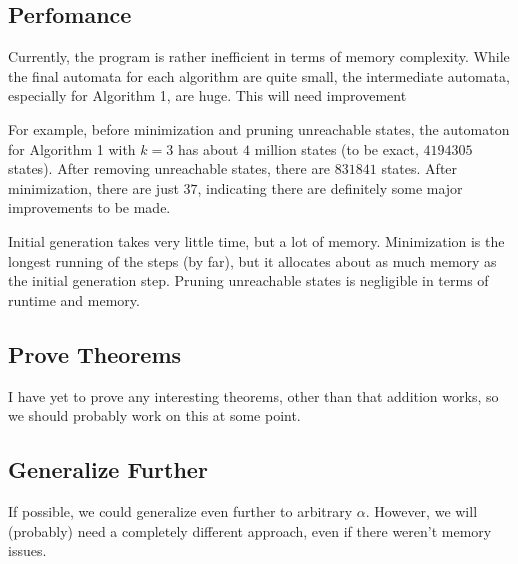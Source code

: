 \documentclass{article}
\theoremstyle{definition}
\theoremstyle{remark}
\theoremstyle{remark}
\theoremstyle{plain}
\theoremstyle{definition}
\begin{document}
\subsection{Perfomance}

Currently, the program is rather inefficient in terms of memory complexity.
While the final automata for each algorithm are quite small, the intermediate automata, especially for Algorithm 1, are huge.
This will need improvement

For example, before minimization and pruning unreachable states, the automaton for Algorithm 1 with $k = 3$ has about $4$ million states (to be exact, $4194305$ states).
After removing unreachable states, there are $831841$ states.
After minimization, there are just $37$, indicating there are definitely some major improvements to be made.

Initial generation takes very little time, but a lot of memory.
Minimization is the longest running of the steps (by far), but it allocates about as much memory as the initial generation step.
Pruning unreachable states is negligible in terms of runtime and memory.

\subsection{Prove Theorems}
I have yet to prove any interesting theorems, other than that addition works, so we should probably work on this at some point.

\subsection{Generalize Further}
If possible, we could generalize even further to arbitrary $\alpha$.
However, we will (probably) need a completely different approach, even if there weren't memory issues.
\end{document}
